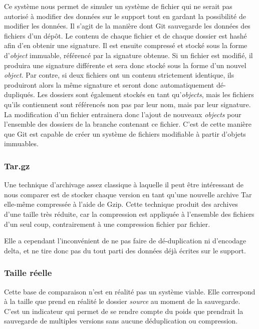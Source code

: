 \documentclass[a4paper,twocolumn]{article}
\begin{document}
Ce système nous permet de simuler un système de fichier qui ne serait
pas autorisé à modifier des données sur le support tout en gardant la
possibilité de modifier les données. Il s'agit de la manière dont Git
sauvegarde les données des fichiers d'un dépôt. Le contenu de chaque
fichier et de chaque dossier est hashé afin d'en obtenir une signature.
Il est ensuite compressé et stocké sous la forme d'\emph{object}
immuable, référencé par la signature obtenue. Si un fichier est modifié,
il produira une signature différente et sera donc stocké sous la forme
d'un nouvel \emph{object}. Par contre, si deux fichiers ont un contenu
strictement identique, ils produiront alors la même signature et seront
donc automatiquement dé-dupliqués. Les dossiers sont également stockés
en tant qu'\emph{objects}, mais les fichiers qu'ils contiennent sont
référencés non pas par leur nom, mais par leur signature. La
modification d'un fichier entrainera donc l'ajout de nouveaux
\emph{objects} pour l'ensemble des dossiers de la branche contenant ce
fichier. C'est de cette manière que Git est capable de créer un système
de fichiers modifiable à partir d'objets immuables.

\subsubsection{Tar.gz}

Une technique d'archivage assez classique à laquelle il peut être
intéressant de nous comparer est de stocker chaque version en tant
qu'une nouvelle archive Tar elle-même compressée à l'aide de Gzip. Cette
technique produit des archives d'une taille très réduite, car la
compression est appliquée à l'ensemble des fichiers d'un seul coup,
contrairement à une compression fichier par fichier.

Elle a cependant l'inconvénient de ne pas faire de dé-duplication ni
d'encodage delta, et ne tire donc pas du tout parti des données déjà
écrites sur le support.

\subsubsection{Taille réelle}

Cette base de comparaison n'est en réalité pas un système viable. Elle
correspond à la taille que prend en réalité le dossier \emph{source} au
moment de la sauvegarde. C'est un indicateur qui permet de se rendre
compte du poids que prendrait la sauvegarde de multiples versions sans
aucune déduplication ou compression.
\end{document}

